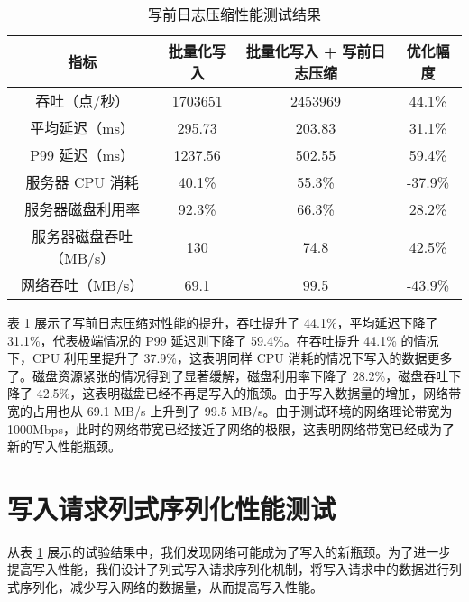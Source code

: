 \begin{table}
  \centering
  \caption{写前日志压缩性能测试结果}
  \begin{tabular}{cccc}
    \toprule 
    指标 & 批量化写入 & 批量化写入 + 写前日志压缩 & 优化幅度 \\
    \midrule
    吞吐（点/秒） & 1703651 & 2453969 & 44.1\%\\
    平均延迟（ms） & 295.73 & 203.83 & 31.1\%\\
    P99 延迟（ms） & 1237.56 & 502.55& 59.4\% \\
    服务器 CPU 消耗 & 40.1\% & 	55.3\% & -37.9\%\\
    服务器磁盘利用率 & 92.3\% & 	66.3\% & 28.2\%\\
    服务器磁盘吞吐（MB/s） & 130 & 	74.8 & 42.5\% \\
    网络吞吐（MB/s） & 69.1 & 	99.5 & -43.9\%\\
    \bottomrule 
  \end{tabular}
  \label{tabular:wal-compression-performance}
\end{table}

表 \ref{tabular:wal-compression-performance} 展示了写前日志压缩对性能的提升，吞吐提升了 44.1\%，平均延迟下降了 31.1\%，代表极端情况的 P99 延迟则下降了 59.4\%。在吞吐提升 44.1\% 的情况下，CPU 利用里提升了 37.9\%，这表明同样 CPU 消耗的情况下写入的数据更多了。磁盘资源紧张的情况得到了显著缓解，磁盘利用率下降了 28.2\%，磁盘吞吐下降了 42.5\%，这表明磁盘已经不再是写入的瓶颈。由于写入数据量的增加，网络带宽的占用也从 69.1 MB/s 上升到了 99.5 MB/s。由于测试环境的网络理论带宽为 1000Mbps，此时的网络带宽已经接近了网络的极限，这表明网络带宽已经成为了新的写入性能瓶颈。


\section{写入请求列式序列化性能测试}
从表 \ref{tabular:wal-compression-performance} 展示的试验结果中，我们发现网络可能成为了写入的新瓶颈。为了进一步提高写入性能，我们设计了列式写入请求序列化机制，将写入请求中的数据进行列式序列化，减少写入网络的数据量，从而提高写入性能。

